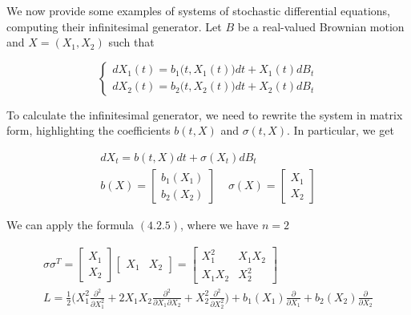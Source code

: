 We now provide some examples of systems of stochastic differential equations, computing their infinitesimal generator. Let $B$ be a real-valued Brownian motion and $X = (X_1,X_2)$ such that

\begin{equation*}
    \begin{cases}
        dX_1(t) = b_1\big(t,X_1(t)\big)dt+X_1(t)dB_t \\
        dX_2(t) = b_2\big(t,X_2(t)\big)dt+X_2(t)dB_t
    \end{cases}
\end{equation*}

To calculate the infinitesimal generator, we need to rewrite the system in matrix form, highlighting the coefficients $b(t,X)$ and $\sigma(t,X)$. In particular, we get

\begin{gather*}
    dX_t = b(t,X) dt + \sigma(X_t) dB_t \\
    b(X) =
    \begin{bmatrix}
        b_1(X_1) \\
        b_2(X_2)
    \end{bmatrix}
    \;\;\;\;
    \sigma(X) = 
    \begin{bmatrix}
        X_1 \\
        X_2
    \end{bmatrix}
\end{gather*}

We can apply the formula $(4.2.5)$, where we have $n=2$

\begin{gather*}
    \sigma \sigma^T = 
    \begin{bmatrix}
        X_1 \\
        X_2
    \end{bmatrix}
    \begin{bmatrix}
        X_1 & X_2
    \end{bmatrix}
    =
    \begin{bmatrix}
        X_1^2 & X_1 X_2 \\
        X_1 X_2 & X_2^2
    \end{bmatrix} \\
    L = \frac{1}{2}\Bigg( X_1^2 \frac{\partial^2}{\partial X_1^2} + 2X_1 X_2 \frac{\partial^2}{\partial X_1 \partial X_2}+ X_2^2 \frac{\partial^2}{\partial X_2^2} \Bigg) + b_1(X_1) \frac{\partial}{\partial X_1} + b_2(X_2) \frac{\partial}{\partial X_2}
\end{gather*}

